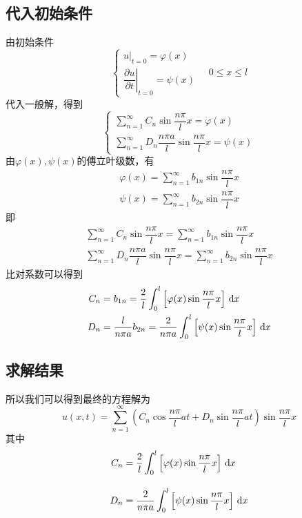 \subsection{代入初始条件}
由初始条件
\begin{equation*}
	\begin{cases}
		\left. u \right|_{t = 0} = \varphi(x)\\[0.5em]
		\left. \dfrac{\partial u}{\partial t} \right|_{t = 0} = \psi(x)
	\end{cases}
	\quad 0 \le x \le l
\end{equation*}
代入一般解，得到
\begin{equation*}
	\begin{cases}
		\displaystyle \sum_{n=1}^{\infty} C_n \sin \dfrac{n \pi}{l} x = \varphi(x)\\[1em]
		\displaystyle\sum_{n=1}^{\infty} D_n \dfrac{n \pi a}{l} \sin \dfrac{n \pi}{l} x = \psi(x)
	\end{cases}
\end{equation*}
由$\varphi(x),\psi(x)$的傅立叶级数，有
\begin{align}
	\varphi(x) = \sum_{n = 1}^{\infty} b_{1n} \sin \dfrac{n \pi}{l}x\\
	\psi(x) = \sum_{n=1}^{\infty} b_{2n} \sin \dfrac{n \pi}{l}x
\end{align}
即
\begin{align*}
	\displaystyle \sum_{n=1}^{\infty} C_n \sin \dfrac{n \pi}{l} x = \sum_{n = 1}^{\infty} b_{1n} \sin \dfrac{n \pi}{l}x \\[1em]
	\displaystyle \sum_{n=1}^{\infty} D_n \dfrac{n \pi a}{l} \sin \dfrac{n \pi}{l} x = \sum_{n = 1}^{\infty} b_{2n} \sin \dfrac{n \pi}{l}x
\end{align*}
比对系数可以得到
\begin{align*}
	C_n &= b_{1n} = \dfrac{2}{l} \int_{0}^{l} \left[\varphi(x) \sin \dfrac{n \pi}{l}x\right] \, {\rm{d}} x\\
	D_n &= \dfrac{l}{n \pi a} b_{2n} = \dfrac{2}{n \pi a}\int_{0}^{l} \left[\psi(x) \sin \dfrac{n \pi}{l}x\right] \, {\rm{d}} x
\end{align*}

\subsection{求解结果}
所以我们可以得到最终的方程解为
\begin{equation}
	u(x, t) = \sum_{n = 1}^{\infty} \left(C_n \cos \dfrac{n \pi}{l}at + D_n \sin \dfrac{n \pi}{l} at \right)\sin \dfrac{n \pi}{l}x
\end{equation}
其中
\begin{align}
	C_n &=  \dfrac{2}{l} \int_{0}^{l} \left[\varphi(x) \sin \dfrac{n \pi}{l}x\right] \, {\rm{d}} x\\[1em]
	D_n &=  \dfrac{2}{n \pi a}\int_{0}^{l} \left[\psi(x) \sin \dfrac{n \pi}{l}x\right] \, {\rm{d}} x
\end{align}

